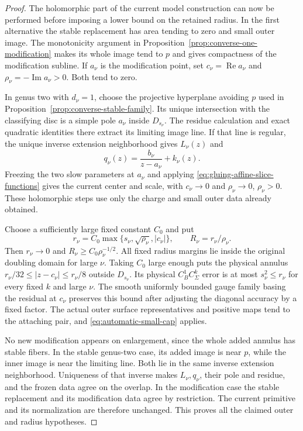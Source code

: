 \documentclass[11pt]{amsart}
\theoremstyle{definition}
\theoremstyle{remark}
\theoremstyle{plain}
\begin{document}
\begin{proof}
The holomorphic part of the current model construction
can now be performed before imposing a lower bound on
the retained radius. In the first alternative the
stable replacement has area tending to zero and small
outer image. The monotonicity argument in
Proposition~\ref{prop:converse-one-modification} makes
its whole image tend to $p$ and gives compactness of
the modification subline. If $a_\nu$ is the modification
point, set $c_\nu=\operatorname{Re}a_\nu$ and
$\rho_\nu=-\operatorname{Im}a_\nu>0$.
Both tend to zero.

In genus two with $d_\nu=1$, choose the projective
hyperplane avoiding $p$ used in
Proposition~\ref{prop:converse-stable-family}.
Its unique intersection with the classifying disc
is a simple pole $a_\nu$ inside $D_{s_\nu}$.
The residue calculation and exact quadratic identities
there extract its limiting image line. If that line
is regular, the unique inverse extension neighborhood
gives $L_\nu(z)$ and
\[
                  q_\nu(z)=\frac{b_\nu}{z-a_\nu}+k_\nu(z).
\]
Freezing the two slow parameters at $a_\nu$ and applying
\eqref{eq:gluing-affine-slice-functions} gives the current
center and scale, with $c_\nu\to0$ and $\rho_\nu\to0$,
$\rho_\nu>0$. These holomorphic steps use only the
charge and small outer data already obtained.

Choose a sufficiently large fixed constant $C_0$ and put
\begin{equation}\label{eq:automatic-radius-choice}
 r_\nu=C_0\max\{s_\nu,\sqrt{\rho_\nu},|c_\nu|\},
                         \qquad R_\nu=r_\nu/\rho_\nu.
\end{equation}
Then $r_\nu\to0$ and $R_\nu\geq C_0\rho_\nu^{-1/2}$.
All fixed radius margins lie inside the original doubling
domain for large $\nu$. Taking $C_0$ large enough puts
the physical annulus
$r_\nu/32\leq|z-c_\nu|\leq r_\nu/8$ outside
$D_{s_\nu}$. Its physical $C^1_BC^k_\Sigma$ error
is at most $s_\nu^2\leq r_\nu$ for every fixed $k$
and large $\nu$. The smooth uniformly bounded gauge
family basing the residual at $c_\nu$ preserves this
bound after adjusting the diagonal accuracy by a fixed
factor. The actual outer surface representatives and
positive maps tend to the attaching pair, and
\eqref{eq:automatic-small-cap} applies.

No new modification appears on enlargement, since the
whole added annulus has stable fibers. In the stable
genus-two case, its added image is near $p$, while the
inner image is near the limiting line. Both lie in the
same inverse extension neighborhood. Uniqueness of that
inverse makes $L_\nu,q_\nu$, their pole and residue,
and the frozen data agree on the overlap. In the
modification case the stable replacement and its
modification data agree by restriction. The current
primitive and its normalization are therefore unchanged.
This proves all the claimed outer and radius hypotheses.
\end{proof}
\end{document}
